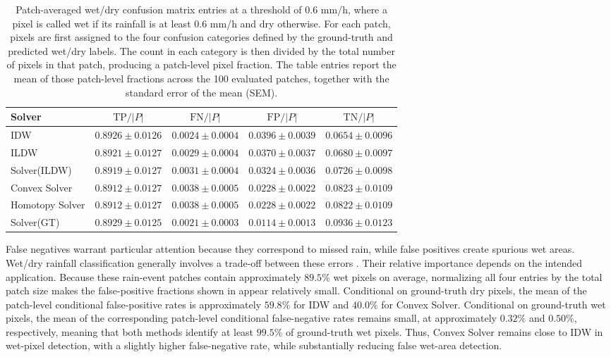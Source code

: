\documentclass[11pt]{article}
\begin{document}
\begin{table}[H]
  \centering
  \scriptsize
  {\color{black}
  \begin{tabular}{lcccc}
    \toprule
    Solver & $\mathrm{TP}/|P|$ & $\mathrm{FN}/|P|$ & $\mathrm{FP}/|P|$ & $\mathrm{TN}/|P|$ \\
    \midrule
    IDW & $0.8926 \pm 0.0126$ & $0.0024 \pm 0.0004$ & $0.0396 \pm 0.0039$ & $0.0654 \pm 0.0096$ \\
    ILDW & $0.8921 \pm 0.0127$ & $0.0029 \pm 0.0004$ & $0.0370 \pm 0.0037$ & $0.0680 \pm 0.0097$ \\
    Solver(ILDW) & $0.8919 \pm 0.0127$ & $0.0031 \pm 0.0004$ & $0.0324 \pm 0.0036$ & $0.0726 \pm 0.0098$ \\
    Convex Solver & $0.8912 \pm 0.0127$ & $0.0038 \pm 0.0005$ & $0.0228 \pm 0.0022$ & $0.0823 \pm 0.0109$ \\
    Homotopy Solver & $0.8912 \pm 0.0127$ & $0.0038 \pm 0.0005$ & $0.0228 \pm 0.0022$ & $0.0822 \pm 0.0109$ \\
    Solver(GT) & $0.8929 \pm 0.0125$ & $0.0021 \pm 0.0003$ & $0.0114 \pm 0.0013$ & $0.0936 \pm 0.0123$ \\
    \bottomrule
  \end{tabular}
  }
  \caption{Patch-averaged wet/dry confusion matrix entries at a threshold of $0.6$ mm/h, where a pixel is called wet if its rainfall is at least $0.6$ mm/h and dry otherwise. For each patch, pixels are first assigned to the four confusion categories defined by the ground-truth and predicted wet/dry labels. The count in each category is then divided by the total number of pixels in that patch, producing a patch-level pixel fraction. The table entries report the mean of those patch-level fractions across the 100 evaluated patches, together with the standard error of the mean (SEM).}
  \label{tab:wetdry_confusion}
\end{table}

{\color{black}False negatives warrant particular attention because they correspond to missed rain, while false positives create spurious wet areas. Wet/dry rainfall classification generally involves a trade-off between these errors \citep{polz2020rainevent}. Their relative importance depends on the intended application. Because these rain-event patches contain approximately $89.5\%$ wet pixels on average, normalizing all four entries by the total patch size makes the false-positive fractions shown in  appear relatively small. Conditional on ground-truth dry pixels, the mean of the patch-level conditional false-positive rates is approximately $59.8\%$ for IDW and $40.0\%$ for Convex Solver. Conditional on ground-truth wet pixels, the mean of the corresponding patch-level conditional false-negative rates remains small, at approximately $0.32\%$ and $0.50\%$, respectively, meaning that both methods identify at least $99.5\%$ of ground-truth wet pixels. Thus, Convex Solver remains close to IDW in wet-pixel detection, with a slightly higher false-negative rate, while substantially reducing false wet-area detection.}
\end{document}
